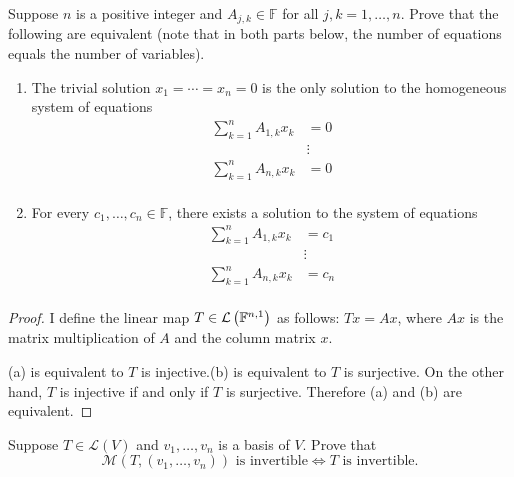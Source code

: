\begin{exercise}
    Suppose $n$ is a positive integer and $A_{j, k} \in \mathbb{F}$ for all $j, k = 1, \ldots, n$. Prove that the following are equivalent (note that in both parts below, the number of equations equals the number of variables).
    \begin{enumerate}[label={(\alph*)}]
        \item The trivial solution $x_{1} = \cdots = x_{n} = 0$ is the only solution to the homogeneous system of equations
              \begin{align*}
                  \sum^{n}_{k=1} A_{1,k}x_{k} & = 0    \\
                                              & \vdots \\
                  \sum^{n}_{k=1} A_{n,k}x_{k} & = 0    \\
              \end{align*}
        \item For every $c_{1}, \ldots, c_{n}\in\mathbb{F}$, there exists a solution to the system of equations
              \begin{align*}
                  \sum^{n}_{k=1} A_{1,k}x_{k} & = c_{1} \\
                                              & \vdots  \\
                  \sum^{n}_{k=1} A_{n,k}x_{k} & = c_{n} \\
              \end{align*}
    \end{enumerate}
\end{exercise}

\begin{proof}
    I define the linear map $T\in\mathcal{L}\left({\mathbb{F}^{n,1}}\right)$ as follows: $Tx = Ax$, where $Ax$ is the matrix multiplication of $A$ and the column matrix $x$.

    (a) is equivalent to $T$ is injective.\@(b) is equivalent to $T$ is surjective. On the other hand, $T$ is injective if and only if $T$ is surjective. Therefore (a) and (b) are equivalent.
\end{proof}
\newpage

\begin{exercise}
    Suppose $T\in\mathcal{L}(V)$ and $v_{1},\ldots, v_{n}$ is a basis of $V$. Prove that
    \[
    \text{$\mathcal{M}(T, (v_{1}, \ldots, v_{n}))$ is invertible}\Longleftrightarrow \text{$T$ is invertible.}
    \]
\end{exercise}


